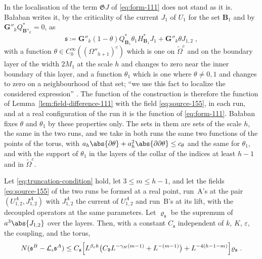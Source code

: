 In the localisation of \cite[(1.61)]{BalabanLFR2} the term $\mathfrak GJ$ of \eqref{eq:form-111} does not stand as it is. Ba{\l}aban writes it, by the criticality of the current $J_1$ of $U_1$ for the set $\mathbf B_1$ and by $\mathbf G''_kQ^*_{\mathbf B''_k} = 0$, as
\begin{equation}\label{eq:source-155}
    \mathfrak s \coloneqq \mathbf G''_k(1 - \theta)Q^*_{\mathbf B_1}\theta_1H^*_{\mathbf B_1}J_1 + \mathbf G''_k\theta J_{1,2}\;,
\end{equation}
with a function $\theta \in C^\infty_0((\Omega''_{h+1})^c)$ which is one on $\tilde\Omega^c$ and on the boundary layer of the width $2M_1$ at the scale $h$ and changes to zero near the inner boundary of this layer, and a function $\theta_1$ which is one where $\theta \neq 0, 1$ and changes to zero on a neighbourhood of that set; ``we use this fact to localize the considered expression'' \cite[(1.55), p.~371]{BalabanLFR2}. The function of the construction is therefore the function of Lemma~\ref{lem:field-difference-111} with the field \eqref{eq:source-155}, in each run, and at a real configuration of the run it is the function of \eqref{eq:form-111}. Ba{\l}aban fixes $\theta$ and $\theta_1$ by these properties only. The sets in them are sets of the scale $h$, the same in the two runs, and we take in both runs the same two functions of the points of the torus, with $a_h\abs{\partial\theta} + a_h^2\abs{\partial\partial\theta} \leq c_\theta$ and the same for $\theta_1$, and with the support of $\theta_1$ in the layers of the collar of the indices at least $h - 1$ and in $\tilde\Omega^c$.

\begin{lemma}\label{lem:source-155}
Let \eqref{eq:truncation-condition} hold, let $3 \leq m \leq h - 1$, and let the fields \eqref{eq:source-155} of the two runs be formed at a real point, run~A's at the pair $(U^A_{1,2}, J^A_{1,2})$ with $J^A_{1,2}$ the current of $U^A_{1,2}$ and run~B's at its lift, with the decoupled operators at the same parameters. Let $\varrho_{\mathfrak s}$ be the supremum of $a^3\abs{J_{1,2}}$ over the layers. Then, with a constant $C_{\mathfrak s}$ independent of $k$, $K$, $\varepsilon$, the coupling, and the torus,
\begin{equation}\label{eq:source-difference}
    N(\mathfrak s^B - \mathcal L_\iota\mathfrak s^A) \leq C_{\mathfrak s}\Bigl[L^{\beta_ck}\bigl(C_{\mathfrak d}L^{-\gamma_H(m-1)} + L^{-(m-1)}\bigr) + L^{-4(h-1-m)}\Bigr]\varrho_{\mathfrak s}\;.
\end{equation}
\end{lemma}

